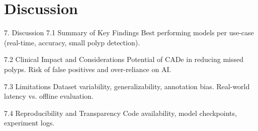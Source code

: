 \section{Discussion}
\label{sec:discussion}

7. Discussion
    7.1 Summary of Key Findings
        Best performing models per use-case (real-time, accuracy, small polyp detection).

    7.2 Clinical Impact and Considerations
        Potential of CADe in reducing missed polyps.
        Risk of false positives and over-reliance on AI.

    7.3 Limitations
        Dataset variability, generalizability, annotation bias.
        Real-world latency vs. offline evaluation.

    7.4 Reproducibility and Transparency
        Code availability, model checkpoints, experiment logs.